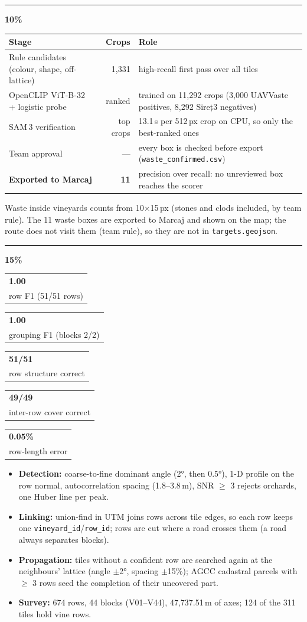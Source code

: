 \documentclass[10pt,a4paper]{article}
\makeatletter
\newcommand{\crit}[3]{%
  \par\vspace{7pt}%
  {\color{#1}\rule[-2pt]{6pt}{12pt}}\hspace{5pt}{\large\bfseries\color{night}#2}\hfill{\bfseries\color{#1}#3}\par
  \vspace{-2pt}{\color{#1}\rule{\linewidth}{0.8pt}}\par\vspace{2pt}}
\newcommand{\kpi}[2]{\begin{tabular}[t]{@{}l@{}}{\Large\bfseries\color{night}#1}\\[-1pt]{\scriptsize\color{muted}#2}\end{tabular}}
\makeatother
\begin{document}
\crit{cWas}{Waste}{10\%}
{\small
\begin{tabularx}{\linewidth}{@{}l r Y@{}}
  \toprule
  \textbf{Stage} & \textbf{Crops} & \textbf{Role} \\
  \midrule
  Rule candidates (colour, shape, off-lattice) & 1,331 & high-recall first pass over all tiles \\
  OpenCLIP ViT-B-32 + logistic probe & ranked & trained on 11,292 crops (3,000 UAVVaste positives, 8,292 Sireț3 negatives) \\
  SAM\,3 verification & top crops & 13.1\,s per 512\,px crop on CPU, so only the best-ranked ones \\
  Team approval & — & every box is checked before export (\texttt{waste\_confirmed.csv}) \\
  \midrule
  \textbf{Exported to Marcaj} & \textbf{11} & precision over recall: no unreviewed box reaches the scorer \\
  \bottomrule
\end{tabularx}}
\par\vspace{2pt}
{\small Waste inside vineyards counts from 10$\times$15\,px (stones and clods included, by team rule). The 11 waste boxes are exported to Marcaj and shown on the map; the route does not visit them (team rule), so they are not in \texttt{targets.geojson}.}

\crit{cAxe}{Row axes}{15\%}
\kpi{1.00}{row F1 (51/51 rows)}\hfill
\kpi{1.00}{grouping F1 (blocks 2/2)}\hfill
\kpi{51/51}{row structure correct}\hfill
\kpi{49/49}{inter-row cover correct}\hfill
\kpi{0.05\%}{row-length error}
\par\vspace{3pt}
{\small
\begin{itemize}
  \item \textbf{Detection:} coarse-to-fine dominant angle (2°, then 0.5°), 1-D profile on the row normal, autocorrelation spacing (1.8--3.8\,m), SNR $\geq$ 3 rejects orchards, one Huber line per peak.
  \item \textbf{Linking:} union-find in UTM joins rows across tile edges, so each row keeps one \texttt{vineyard\_id}/\texttt{row\_id}; rows are cut where a road crosses them (a road always separates blocks).
  \item \textbf{Propagation:} tiles without a confident row are searched again at the neighbours' lattice (angle $\pm$2°, spacing $\pm$15\%); AGCC cadastral parcels with $\geq$ 3 rows seed the completion of their uncovered part.
  \item \textbf{Survey:} 674 rows, 44 blocks (V01--V44), 47,737.51\,m of axes; 124 of the 311 tiles hold vine rows.
\end{itemize}}
\end{document}
